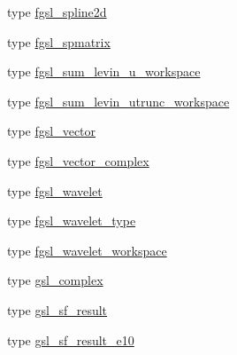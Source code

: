 \begin{DoxyCompactItemize}
\item 
type \hyperlink{structfgsl_1_1fgsl__spline2d}{fgsl\+\_\+spline2d}
\item 
type \hyperlink{structfgsl_1_1fgsl__spmatrix}{fgsl\+\_\+spmatrix}
\item 
type \hyperlink{structfgsl_1_1fgsl__sum__levin__u__workspace}{fgsl\+\_\+sum\+\_\+levin\+\_\+u\+\_\+workspace}
\item 
type \hyperlink{structfgsl_1_1fgsl__sum__levin__utrunc__workspace}{fgsl\+\_\+sum\+\_\+levin\+\_\+utrunc\+\_\+workspace}
\item 
type \hyperlink{structfgsl_1_1fgsl__vector}{fgsl\+\_\+vector}
\item 
type \hyperlink{structfgsl_1_1fgsl__vector__complex}{fgsl\+\_\+vector\+\_\+complex}
\item 
type \hyperlink{structfgsl_1_1fgsl__wavelet}{fgsl\+\_\+wavelet}
\item 
type \hyperlink{structfgsl_1_1fgsl__wavelet__type}{fgsl\+\_\+wavelet\+\_\+type}
\item 
type \hyperlink{structfgsl_1_1fgsl__wavelet__workspace}{fgsl\+\_\+wavelet\+\_\+workspace}
\item 
type \hyperlink{structfgsl_1_1gsl__complex}{gsl\+\_\+complex}
\item 
type \hyperlink{structfgsl_1_1gsl__sf__result}{gsl\+\_\+sf\+\_\+result}
\item 
type \hyperlink{structfgsl_1_1gsl__sf__result__e10}{gsl\+\_\+sf\+\_\+result\+\_\+e10}
\end{DoxyCompactItemize}
